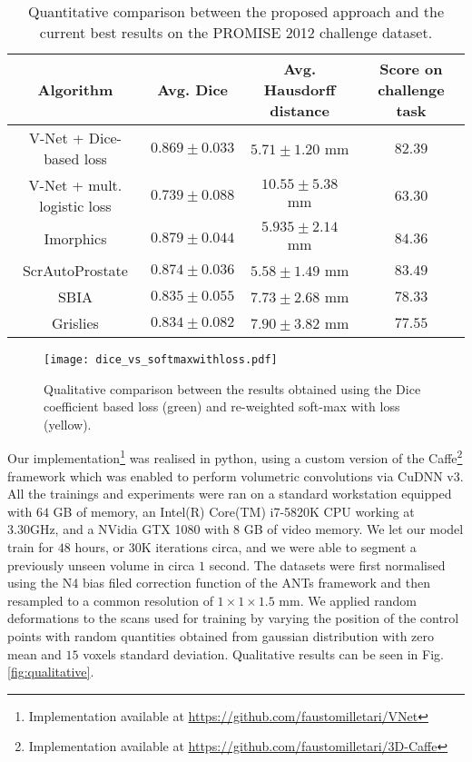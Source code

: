 \documentclass{llncs}
\begin{document}
\begin{table}
\caption{Quantitative comparison between the proposed approach and the current best results on the PROMISE 2012 challenge dataset.} \label{tab:res}
\begin{tabular}{|c|c|c|c|}
\hline 
Algorithm & Avg. Dice & Avg. Hausdorff distance & Score on challenge task\tabularnewline
\hline 
\hline 
V-Net + Dice-based loss & $0.869 \pm 0.033$ & $5.71 \pm 1.20$ mm & $82.39$\tabularnewline
\hline 
V-Net + mult. logistic loss & $0.739 \pm 0.088 $ & $10.55 \pm 5.38$ mm & $63.30$\tabularnewline
\hline 
Imorphics \cite{imorp} & $0.879 \pm 0.044$ & $5.935 \pm 2.14 $ mm & $84.36$\tabularnewline
\hline 
ScrAutoProstate & $0.874 \pm 0.036$ & $5.58 \pm 1.49 $ mm & $83.49$ \tabularnewline
\hline
SBIA & $0.835 \pm 0.055$ & $7.73 \pm 2.68 $ mm & $78.33$ \tabularnewline
\hline
Grislies & $0.834 \pm 0.082$ & $7.90 \pm 3.82 $ mm & $77.55$ \tabularnewline
\hline

\end{tabular}

\end{table}

\begin{figure} 	
\centering 	
\texttt{[image: dice\_vs\_softmaxwithloss.pdf]} 	
\caption{Qualitative comparison between the results obtained using the Dice coefficient based loss (green) and re-weighted soft-max with loss (yellow).} \label{fig:qualitativecomparison} 
\end{figure}

Our implementation\footnote{Implementation available at \url{https://github.com/faustomilletari/VNet}} was realised in python, using a custom version of the Caffe\footnote{Implementation available at \url{https://github.com/faustomilletari/3D-Caffe}} \cite{jia2014caffe} framework which was enabled to perform volumetric convolutions via CuDNN v3. All the trainings and experiments were ran on a standard workstation equipped with $64$ GB of memory, an Intel(R) Core(TM) i7-5820K CPU working at 3.30GHz, and a NVidia GTX 1080 with $8$ GB of video memory. We let our model train for $48$ hours, or $30$K iterations circa, and we were able to segment a previously unseen volume in circa $1$ second. The datasets were first normalised using the N4 bias filed correction function of the ANTs framework \cite{tustison2010n4itk} and then resampled to a common resolution of $1\times1\times1.5$ mm. We applied random deformations to the scans used for training by varying the position of the control points with random quantities obtained from gaussian distribution with zero mean and $15$ voxels standard deviation. Qualitative results can be seen in Fig. \ref{fig:qualitative}. 
\end{document}
